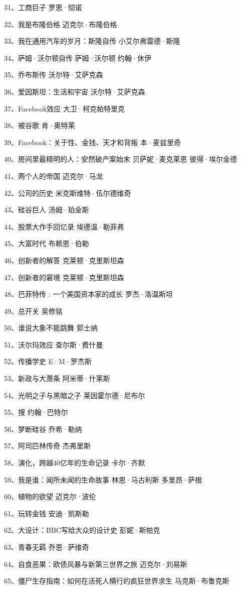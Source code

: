 31、工商巨子 罗恩·彻诺

32、我是布隆伯格 迈克尔·布隆伯格

33、我在通用汽车的岁月：斯隆自传 小艾尔弗雷德·斯隆

34、萨姆·沃尔顿自传 萨姆·沃尔顿 约翰·休伊

35、乔布斯传 沃尔特·艾萨克森

36、爱因斯坦：生活和宇宙 沃尔特·艾萨克森

37、Facebook效应 大卫·柯克帕特里克

38、被谷歌 肯·奥特莱

39、Facebook：关于性、金钱、天才和背叛 本·麦兹里奇

40、房间里最精明的人：安然破产案始末 贝萨妮·麦克莱恩 彼得·埃尔金德

41、两个人的帝国 迈克尔·马龙

42、公司的历史 米克斯维特·伍尔德维奇

43、硅谷巨人 汤姆·珀金斯

44、股票大作手回忆录 埃德温·勒菲弗

45、大富时代 布赖恩·伯勒

46、创新者的解答 克莱顿·克里斯坦森

47、创新者的窘境 克莱顿·克里斯坦森

48、巴菲特传 : 一个美国资本家的成长 罗杰·洛温斯坦

49、总开关 吴修铭

50、谁说大象不能跳舞 郭士纳

51、沃尔玛效应 查尔斯·费什曼

52、传播学史 E·M·罗杰斯

53、新政与大萧条 阿米蒂·什莱斯

54、光明之子与黑暗之子 莱因霍尔德·尼布尔

55、搜 约翰·巴特尔

56、梦断硅谷 乔希·勒纳

57、阿司匹林传奇 杰弗里斯

58、演化，跨越40亿年的生命记录 卡尔·齐默

59、我是谁：闻所未闻的生命故事 林恩·马古利斯 多里昂·萨根

60、植物的欲望 迈克尔·波伦

61、玩转金钱 安迪·凯斯勒

62、大设计：BBC写给大众的设计史 彭妮·斯帕克

63、青春无羁 乔恩·萨维奇

64、自食恶果：欧债风暴与新第三世界之旅 迈克尔·刘易斯

65、僵尸生存指南：如何在活死人横行的疯狂世界求生 马克斯·布鲁克斯

